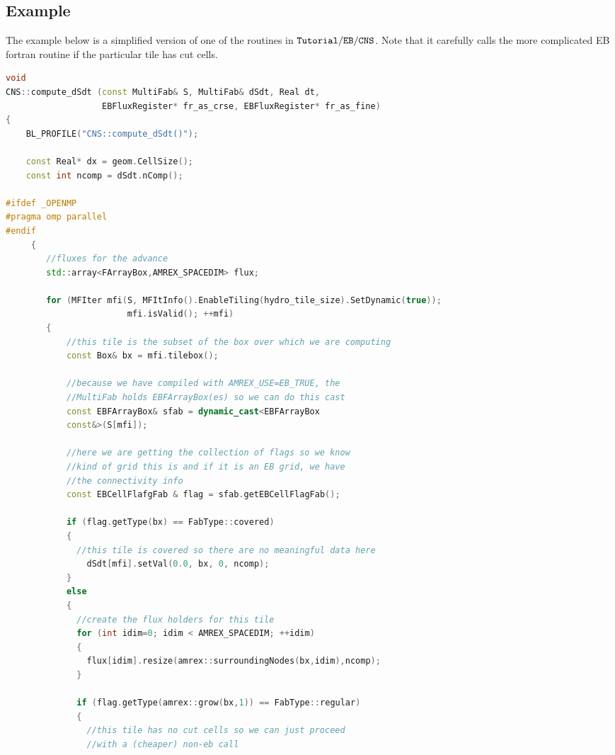 \subsection{Example}
The example below is a simplified version
of one of the routines in $\tt{Tutorial/EB/CNS}$.   Note  that  it
carefully calls the more complicated EB fortran routine if the
particular tile has cut cells.

\begin{lstlisting}[language=cpp]
void
CNS::compute_dSdt (const MultiFab& S, MultiFab& dSdt, Real dt,
                   EBFluxRegister* fr_as_crse, EBFluxRegister* fr_as_fine)
{
    BL_PROFILE("CNS::compute_dSdt()");

    const Real* dx = geom.CellSize();
    const int ncomp = dSdt.nComp();

#ifdef _OPENMP
#pragma omp parallel
#endif
     {
        //fluxes for the advance
        std::array<FArrayBox,AMREX_SPACEDIM> flux;

        for (MFIter mfi(S, MFItInfo().EnableTiling(hydro_tile_size).SetDynamic(true));
                        mfi.isValid(); ++mfi)
        {
            //this tile is the subset of the box over which we are computing
            const Box& bx = mfi.tilebox();

            //because we have compiled with AMREX_USE=EB_TRUE, the
            //MultiFab holds EBFArrayBox(es) so we can do this cast
            const EBFArrayBox& sfab = dynamic_cast<EBFArrayBox
            const&>(S[mfi]);
            
            //here we are getting the collection of flags so we know
            //kind of grid this is and if it is an EB grid, we have
            //the connectivity info
            const EBCellFlafgFab & flag = sfab.getEBCellFlagFab();

            if (flag.getType(bx) == FabType::covered) 
            {
              //this tile is covered so there are no meaningful data here
                dSdt[mfi].setVal(0.0, bx, 0, ncomp);
            } 
            else 
            {
              //create the flux holders for this tile
              for (int idim=0; idim < AMREX_SPACEDIM; ++idim) 
              {
                flux[idim].resize(amrex::surroundingNodes(bx,idim),ncomp);
              }

              if (flag.getType(amrex::grow(bx,1)) == FabType::regular)
              {
                //this tile has no cut cells so we can just proceed
                //with a (cheaper) non-eb call


\end{lstlisting}
